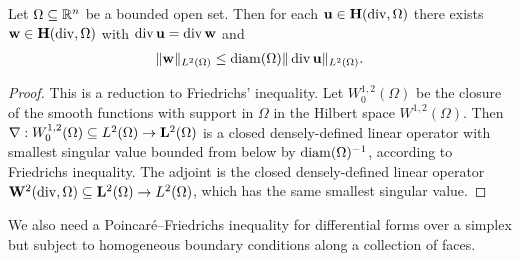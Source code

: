 \documentclass[10pt,letterpaper]{article}
\begin{document}
\begin{lemma}\label{lemma:PFfordivergence}
    Let $\Omega \subseteq {\mathbb R}^{n}$ be a bounded open set. 
    Then for each ${\mathbf u} \in {\mathbf H}(\operatorname{div},\Omega)$ there exists ${\mathbf w} \in {\mathbf H}(\operatorname{div},\Omega)$ with $\operatorname{div} {\mathbf u} = \operatorname{div} {\mathbf w}$ and 
    \begin{align*}
        \| {\mathbf w} \|_{L^{2}(\Omega)} 
        \leq 
        {\operatorname{diam}}(\Omega) \| \operatorname{div} {\mathbf u} \|_{L^{2}(\Omega)}
        .
    \end{align*}
\end{lemma}
\begin{proof}
    This is a reduction to Friedrichs' inequality. 
    Let $W^{1,2}_{0}(\Omega)$ be the closure of the smooth functions with support in $\Omega$ in the Hilbert space $W^{1,2}(\Omega)$. 
    Then $\nabla : W^{1,2}_{0}(\Omega) \subseteq L^{2}(\Omega) \rightarrow {\mathbf L}^{2}(\Omega)$ is a closed densely-defined linear operator 
    with smallest singular value bounded from below by ${\operatorname{diam}}(\Omega)^{-1}$, according to Friedrichs inequality. 
    The adjoint is the closed densely-defined linear operator ${\mathbf W}^{2}(\operatorname{div},\Omega) \subseteq {\mathbf L}^{2}(\Omega) \rightarrow L^{2}(\Omega)$,
    which has the same smallest singular value. 
\end{proof}


We also need a Poincar\'e--Friedrichs inequality for differential forms over a simplex but subject to homogeneous boundary conditions along a collection of faces. 
\end{document}
